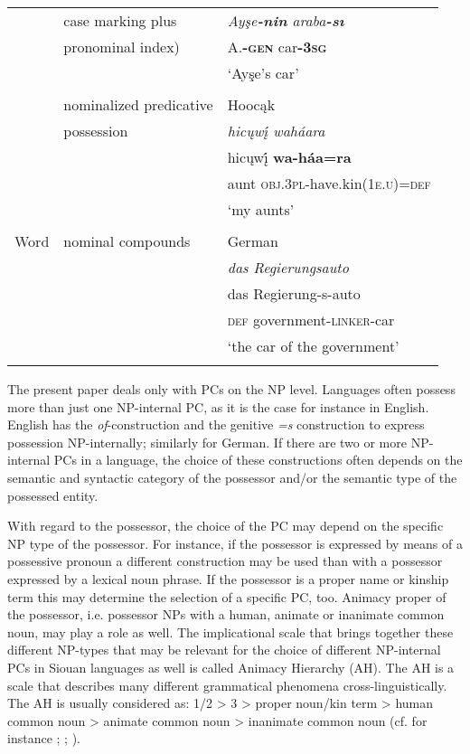 \documentclass[output=paper]{LSP/langsci}
\begin{document}
\begin{table}
\begin{tabularx}{\textwidth}{l l X }
& case marking plus &\textit{Ayşe\textbf{-nin} araba\textbf{-sı}} \\
& pronominal index) & 	A.\textbf{-\textsc{gen}}    car\textbf{-\textsc{3sg}} \\
& & `Ayşe's car' \\
& \\
& nominalized predicative  & Hooc\k{a}k \citep[19]{Helmbrecht2003} \\
& possession & \textit{hicųwį́ waháara} \\
& & hicųwį́  \textbf{wa-háa=ra} \\
& & aunt      \textsc{obj.3pl}-have.kin(\textsc{1e.u})=\textsc{def} \\
& & `my aunts' \\
& \\
Word & nominal compounds & German \\
& & \textit{das Regierungsauto} \\
& & das Regierung-s-auto \\
& & \textsc{def} government-\textsc{linker}-car \\
& & `the car of the government' \\
\lspbottomrule
\end{tabularx}
\end{table}

The present paper deals only with PCs on the NP level. Languages often possess more than just one NP-internal PC, as it is the case for instance in English. English has the \textit{of}-construction and the genitive \textit{=s} construction to express possession NP-internally; similarly for German. If there are two or more NP-internal PCs in a language, the choice of these constructions often depends on the semantic and syntactic category of the possessor and/or the semantic type of the possessed entity. 

With regard to the possessor, the choice of the PC may depend on the specific NP type of the possessor. For instance, if the possessor is expressed by means of a possessive pronoun a different construction may be used than with a possessor expressed by a lexical noun phrase. If the possessor is a proper name or kinship term this may determine the selection of a specific PC, too. Animacy proper of the possessor, i.e. possessor NPs with a human, animate or inanimate common noun, may play a role as well. The implicational scale that brings together these different NP-types that may be relevant for the choice of different NP-internal PCs in Siouan languages as well is called Animacy Hierarchy (AH). The AH is a scale that describes many different grammatical phenomena cross-linguistically. The AH is usually considered as: 1/2 > 3 > proper noun/kin term > human common noun > animate common noun > inanimate common noun (cf. for instance \citealt{Dixon1979}; \citealt{Comrie1989}; \citealt{Croft2003}).
\end{document}
